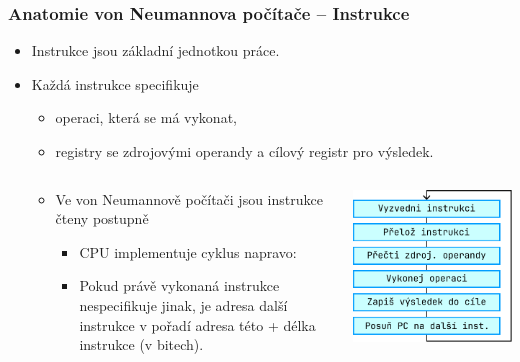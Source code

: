 \documentclass[aspectratio=169,11pt,svgnames,handout]{beamer}
\begin{document}
\begin{frame}
 \frametitle{Anatomie von Neumannova počítače -- Instrukce}
 \begin{itemize}[label=\textbullet]
  \item Instrukce jsou základní jednotkou práce.\pause
  \item Každá instrukce specifikuje
  \begin{itemize}[label=\textemdash]
   \item \alert{operaci}, která se má vykonat,\pause
   \item registry se zdrojovými \alert{operandy} a \alert{cílový registr} pro
    výsledek.
  \end{itemize}
  \begin{columns}[T]
   \begin{column}{.65\textwidth}
    \begin{itemize}[label=\textbullet]
     \item Ve von Neumannově počítači jsou instrukce čteny postupně
     \pause
     \begin{itemize}[label=\textemdash]
      \item CPU implementuje cyklus napravo:
      \item Pokud právě vykonaná instrukce nespecifikuje jinak, je adresa další
       instrukce v pořadí adresa této + délka instrukce (v bitech).
     \end{itemize}
    \end{itemize}
   \end{column}
   \begin{column}{.29\textwidth}
    \begin{center}
     \includegraphics[width=\textwidth]{instruction-reading.pdf}
    \end{center}
   \end{column}
  \end{columns}
 \end{itemize}
\end{frame}
\end{document}
